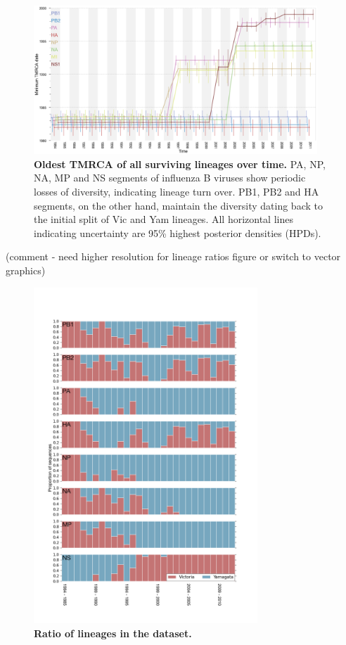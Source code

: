 \documentclass[11pt,oneside,letterpaper]{article}
\begin{document}
\begin{figure}[h]
	\centering		
	\includegraphics[width=0.95\textwidth]{figures/InfB_tmrcaOT_lines.png}
	\caption{\textbf{Oldest TMRCA of all surviving lineages over time.}
PA, NP, NA, MP and NS segments of influenza B viruses show periodic losses of diversity, indicating lineage turn over.
PB1, PB2 and HA segments, on the other hand, maintain the diversity dating back to the initial split of Vic and Yam lineages.
All horizontal lines indicating uncertainty are 95\% highest posterior densities (HPDs).}
	\label{tmrcaOT}
\end{figure}

(comment - need higher resolution for lineage ratios figure or switch to vector graphics)
\begin{figure}[h]
	\centering	
	\includegraphics[width=0.75\textwidth]	{figures/InfB_LineageRatiosOverTime.png}
	\caption{\textbf{Ratio of lineages in the dataset.}}
	\label{lineageRatiosOverTime}
\end{figure}
\end{document}
